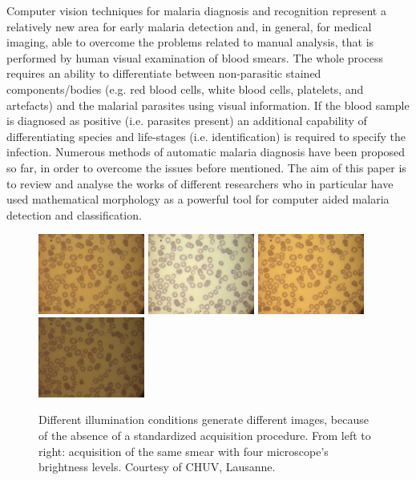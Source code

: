 \documentclass[sensors,review,submit,moreauthors,pdftex,10pt,a4paper]{mdpi}
\begin{document}
Computer vision techniques for malaria diagnosis and recognition represent a relatively new area for early malaria detection and, in general, for medical imaging, able to overcome the problems related to manual analysis, that is performed by human visual examination of blood smears. The whole process requires an ability to differentiate between non-parasitic stained components/bodies (e.g. red blood cells, white blood cells, platelets, and artefacts) and the malarial parasites using visual information. If the blood sample is diagnosed as positive (i.e. parasites present) an additional capability of differentiating species and life-stages (i.e. identification) is required to specify the infection. Numerous methods of automatic malaria diagnosis have been proposed so far, in order to overcome the issues before mentioned. The aim of this paper is to review and analyse the works of different researchers who in particular have used mathematical morphology as a powerful tool for computer aided malaria detection and classification.

\begin{figure}[!t]
	\centering	
	\includegraphics[width=3.5cm]{img/f1a}
	\includegraphics[width=3.5cm]{img/f1b}
	\includegraphics[width=3.5cm]{img/f1c}
	\includegraphics[width=3.5cm]{img/f1d}
	\caption{\label{fig:images_types}Different illumination conditions generate different images, because of the absence of a standardized acquisition procedure. From left to right: acquisition of the same smear with four microscope's brightness levels.\newline
		Courtesy of CHUV, Lausanne.}
\end{figure}
\end{document}
